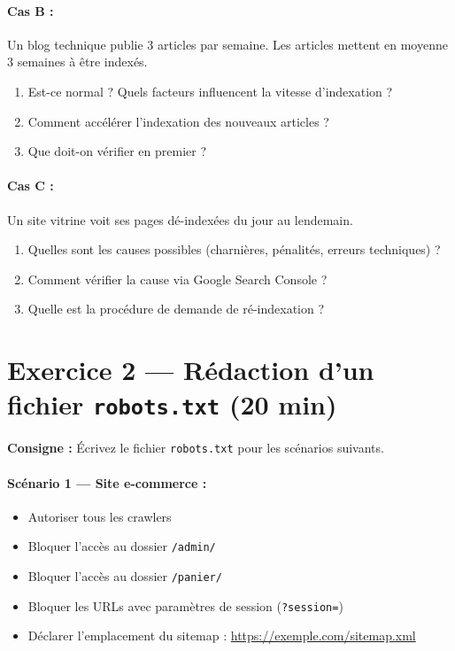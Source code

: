 \documentclass[12pt,a4paper]{report}
\begin{document}
\paragraph{Cas B :} Un blog technique publie 3 articles par semaine. Les articles mettent en moyenne 3 semaines \`{a} \^{e}tre index\'{e}s.

\begin{enumerate}
    \item Est-ce normal ? Quels facteurs influencent la vitesse d'indexation ?
    \item Comment acc\'{e}l\'{e}rer l'indexation des nouveaux articles ?
    \item Que doit-on v\'{e}rifier en premier ?
\end{enumerate}

\paragraph{Cas C :} Un site vitrine voit ses pages d\'{e}-index\'{e}es du jour au lendemain.

\begin{enumerate}
    \item Quelles sont les causes possibles (charni\`{e}res, p\'{e}nalit\'{e}s, erreurs techniques) ?
    \item Comment v\'{e}rifier la cause via Google Search Console ?
    \item Quelle est la proc\'{e}dure de demande de r\'{e}-indexation ?
\end{enumerate}

\section{Exercice 2 --- R\'{e}daction d'un fichier \texttt{robots.txt} (20 min)}

\textbf{Consigne :} \'{E}crivez le fichier \texttt{robots.txt} pour les sc\'{e}narios suivants.

\paragraph{Sc\'{e}nario 1 --- Site e-commerce :}
\begin{itemize}
    \item Autoriser tous les crawlers
    \item Bloquer l'acc\`{e}s au dossier \texttt{/admin/}
    \item Bloquer l'acc\`{e}s au dossier \texttt{/panier/}
    \item Bloquer les URLs avec param\`{e}tres de session (\texttt{?session=})
    \item D\'{e}clarer l'emplacement du sitemap : \url{https://exemple.com/sitemap.xml}
\end{itemize}
\end{document}
